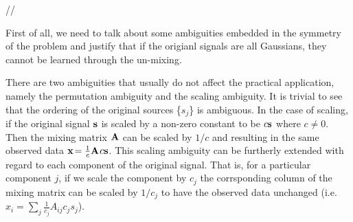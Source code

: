 \documentclass[aps,prl,preprint,superscriptaddress]{revtex4-2}
\begin{document}
//

First of all, we need to talk about some ambiguities embedded in the symmetry of the problem and justify that if the origianl signals are all Gaussians, they cannot be learned through the un-mixing. 

There are two ambiguities that usually do not affect the practical application, namely the permutation ambiguity and the scaling ambiguity. It is trivial to see that the ordering of the original sources \{$s_{j}$\} is ambiguous. In the case of scaling, if the original signal $\bf{s}$ is scaled by a non-zero constant to be $c\bf{s}$ where $c \neq 0$. Then the mixing matrix $\bf{A}$ can be scaled by $1/c$ and resulting in the same observed data $\bf{x}$$ = \frac{1}{c}\bf{A}$$c\bf{s}$. This scaling ambiguity can be furtherly extended with regard to each component of the original signal. That is, for a particular component $j$, if we scale the component by $c_{j}$ the corrsponding column of the mixing matrix can be scaled by $1/c_{j}$ to have the observed data unchanged (i.e. $x_{i} = \sum_{j}\frac{1}{c_{j}}A_{ij}c_{j}s_{j}$).  
\end{document}
